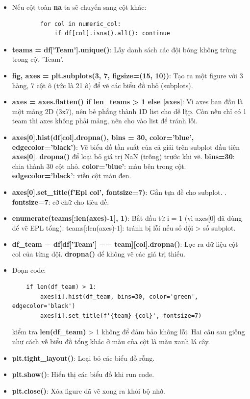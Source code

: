     \begin{itemize}
        \item Nếu cột toàn \textbf{na} ta sẽ chuyển sang cột khác:
        \begin{verbatim}
        for col in numeric_col:
            if df[col].isna().all(): continue
        \end{verbatim}
        \item \textbf{teams = df['Team'].unique()}: Lấy danh sách các đội bóng không trùng trong cột 'Team'.
        \item \textbf{fig, axes = plt.subplots(3, 7, figsize=(15, 10))}: Tạo ra một figure với 3 hàng, 7 cột ô (tức là 21 ô) để vẽ các biểu đồ nhỏ (subplots).
        \item \textbf{axes = axes.flatten() if len\_teams > 1 else [axes]}: Vì axes ban đầu là một mảng 2D (3x7), nên bẻ phẳng thành 1D list cho dễ lặp. Còn nếu chỉ có 1 team thì axes không phải mảng, nên cho vào list để tránh lỗi.
        \item \textbf{axes[0].hist(df[col].dropna(), bins = 30, color='blue', edgecolor='black')}: Vẽ biểu đồ tần suất của cả giải trên subplot đầu tiên \textbf{axes[0]}. \textbf{dropna()} để loại bỏ giá trị NaN (trống) trước khi vẽ. \textbf{bins=30}: chia thành 30 cột nhỏ.  \textbf{color='blue'}: màu bên trong cột.  \textbf{edgecolor='black'}: viền cột màu đen.
        \item \textbf{axes[0].set\_title(f'Epl {col}', fontsize=7)}: Gắn tựa đề cho subplot. . \textbf{fontsize=7}: cỡ chữ cho tiêu đề.
        \item \textbf{enumerate(teams[:len(axes)-1], 1)}: Bắt đầu từ i = 1 (vì axes[0] đã dùng để vẽ EPL tổng). teams[:len(axes)-1]: tránh bị lỗi nếu số đội > số subplot.
        \item \textbf{df\_team = df[df['Team'] == team][col].dropna()}: Lọc ra dữ liệu cột col của từng đội. \textbf{dropna()} để không vẽ các giá trị thiếu.
        \item Đoạn code:
    \begin{verbatim}
    if len(df_team) > 1:
        axes[i].hist(df_team, bins=30, color='green', edgecolor='black')
        axes[i].set_title(f'{team} {col}', fontsize=7)
    \end{verbatim}
        kiểm tra \textbf{len(df\_team)} > 1 không để đảm bảo không lỗi. Hai câu sau giống như cách vễ biểu đồ tổng khác ở màu của cột là màu xanh lá cây.
        \item \textbf{plt.tight\_layout()}: Loại bỏ các biểu đồ rỗng.
        \item \textbf{plt.show()}: Hiển thị các biểu đồ khi run code.
        \item \textbf{plt.close()}: Xóa figure đã vẽ xong ra khỏi bộ nhớ.
    \end{itemize}
